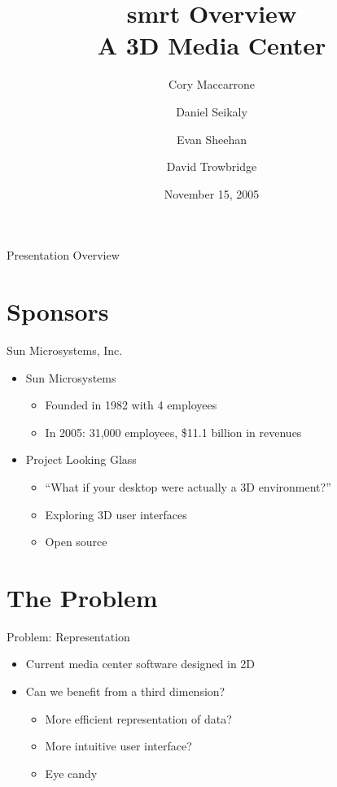 \documentclass[style=smrt,mode=present,paper=screen]{powerdot}
\title{\huge{\textbf{smrt Overview}} \\ \small{A 3D Media Center}}
\author {
	Cory Maccarrone
	\and
	Daniel Seikaly
	\and
	Evan Sheehan
	\and
	David Trowbridge
}
\date{November 15, 2005}
\begin{document}
\maketitle


\begin{slide}[toc=,bm=]{Presentation Overview}
\tableofcontents[content=all]
\end{slide}


\section[slide=false]{Sponsors}
\begin{slide}{Sun Microsystems, Inc.}
\begin{itemize}
\item Sun Microsystems \\
\begin{itemize}
	\item Founded in 1982 with 4 employees \\
	\item In 2005: 31,000 employees, \$11.1 billion in revenues \\
\end{itemize}
\item Project Looking Glass \\
\begin{itemize}
	\item ``What if your desktop were actually a 3D environment?'' \\
	\item Exploring 3D user interfaces \\
	\item Open source \\
\end{itemize}
\end{itemize}
\end{slide}

\section[slide=false]{The Problem}
\begin{slide}[toc=,bm=]{Problem: Representation}
\begin{itemize}
\item Current media center software designed in 2D \\
\item Can we benefit from a third dimension? \\
\begin{itemize}
	\item More efficient representation of data? \\
	\item More intuitive user interface? \\
	\item Eye candy
\end{itemize}
\end{itemize}
\end{slide}
\end{document}
